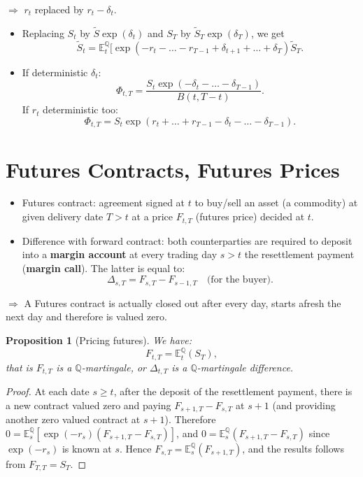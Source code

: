 \documentclass[
  12pt,
]{book}
\providecommand{\tightlist}{%
  \setlength{\itemsep}{0pt}\setlength{\parskip}{0pt}}
\newtheorem{proposition}{Proposition}[chapter]
\theoremstyle{definition}
\theoremstyle{definition}
\theoremstyle{definition}
\theoremstyle{definition}
\theoremstyle{remark}
\begin{document}
\(\Rightarrow\) \(r_t\) replaced by \(r_t - \delta_t\).

\begin{itemize}
\tightlist
\item
  Replacing \(S_t\) by \(\tilde{S} \exp(\delta_t)\) and \(S_T\) by \(\tilde{S}_T \exp (\delta_T)\), we get
  \[
  \tilde{S}_t = \mathbb{E}^{\mathbb{Q}}_t [\exp (-r_t -\ldots-r_{T-1} + \delta_{t+1} + \ldots + \delta_T) \tilde{S}_T.
  \]
\item
  If deterministic \(\delta_t\):
  \[
  \Phi_{t,T} = \frac{S_t \exp (-\delta_t - \ldots - \delta_{T-1})}{B(t,T-t)}.
  \]
  If \(r_t\) deterministic too:
  \[
  \Phi_{t,T} = S_t \exp   (r_t + \ldots + r_{T-1} - \delta_t - \ldots - \delta_{T-1}).
  \]
\end{itemize}

\hypertarget{FCFPFutures}{%
\section{Futures Contracts, Futures Prices}\label{FCFPFutures}}

\begin{itemize}
\tightlist
\item
  Futures contract: agreement signed at \(t\) to buy/sell an asset (a commodity) at given delivery date \(T>t\) at a price \(F_{t,T}\) (futures price) decided at \(t\).
\item
  Difference with forward contract: both counterparties are required to deposit into a \textbf{margin account} at every trading day \(s>t\) the resettlement payment (\textbf{margin call}). The latter is equal to:
  \[
  \Delta_{s,T} = F_{s,T} - F_{s-1,T} \quad \mbox{(for the buyer)}.
  \]
\end{itemize}

\(\Rightarrow\) A Futures contract is actually closed out after every
day, starts afresh the next day and therefore is valued zero.

\begin{proposition}[Pricing futures]
\protect\hypertarget{prp:future}{}\label{prp:future}We have:
\[
F_{t,T} = \mathbb{E}^{\mathbb{Q}}_t (S_T),
\]
that is \(F_{t,T}\) is a \(\mathbb{Q}\)-martingale, or \(\Delta_{t,T}\) is a \(\mathbb{Q}\)-martingale difference.
\end{proposition}

\begin{proof}
At each date \(s\ge t\), after the deposit of the resettlement payment, there is a new contract valued zero and paying \(F_{s+1,T} - F_{s,T}\) at \(s+1\) (and providing another zero valued contract at \(s+1\)). Therefore \(0 = \mathbb{E}^{\mathbb{Q}}_s [\exp (-r_s) (F_{s+1,T} - F_{s,T})]\), and \(0 = \mathbb{E}^{\mathbb{Q}}_s (F_{s+1,T} - F_{s,T})\) since \(\exp (-r_s)\) is known at \(s\). Hence \(F_{s,T} = \mathbb{E}^{\mathbb{Q}}_s (F_{s+1,T})\), and the results follows from \(F_{T,T} = S_T\).
\end{proof}
\end{document}

